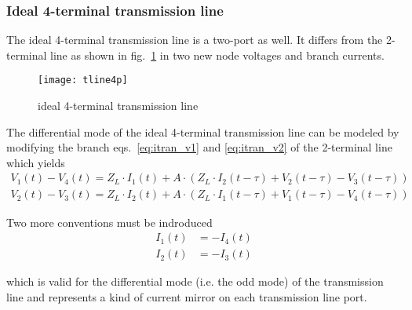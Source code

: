 \subsubsection{Ideal 4-terminal transmission line}

The ideal 4-terminal transmission line is a two-port as well.  It
differs from the 2-terminal line as shown in
fig.~\ref{fig:TransLine4P} in two new node voltages and branch
currents.

\begin{figure}[ht]
\begin{center}
\texttt{[image: tline4p]}
\end{center}
\label{fig:TransLine4P}
\caption{ideal 4-terminal transmission line}
\end{figure}
\FloatBarrier

The differential mode of the ideal 4-terminal transmission line can be
modeled by modifying the branch eqs.~\eqref{eq:itran_v1} and
\eqref{eq:itran_v2} of the 2-terminal line which yields
\begin{align}
V_1\left(t\right) - V_4\left(t\right) = Z_L\cdot I_1\left(t\right) + A\cdot\left( Z_L\cdot I_2\left(t -\tau\right) + V_2\left(t -\tau\right) - V_3\left(t -\tau\right)\right)\\
V_2\left(t\right) - V_3\left(t\right) = Z_L\cdot I_2\left(t\right) + A\cdot\left( Z_L\cdot I_1\left(t -\tau\right) + V_1\left(t -\tau\right) - V_4\left(t -\tau\right)\right)
\end{align}

Two more conventions must be indroduced
\begin{align}
I_1\left(t\right) &= -I_4\left(t\right)\\
I_2\left(t\right) &= -I_3\left(t\right)
\end{align}

which is valid for the differential mode (i.e. the odd mode) of the
transmission line and represents a kind of current mirror on each
transmission line port.

\addvspace{12pt}

